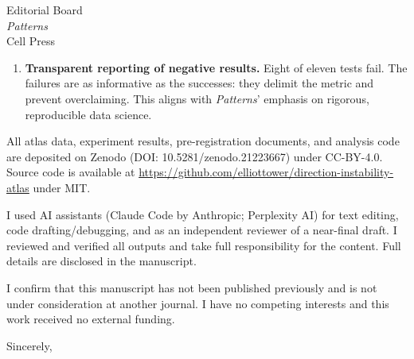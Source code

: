 \documentclass[11pt]{letter}
\begin{document}
\begin{letter}{Editorial Board \\ \emph{Patterns} \\ Cell Press}
\begin{enumerate}
\item \textbf{Transparent reporting of negative results.} Eight of eleven tests fail. The failures are as informative as the successes: they delimit the metric and prevent overclaiming. This aligns with \emph{Patterns}' emphasis on rigorous, reproducible data science.
\end{enumerate}

All atlas data, experiment results, pre-registration documents, and analysis code are deposited on Zenodo (DOI: 10.5281/zenodo.21223667) under CC-BY-4.0. Source code is available at \url{https://github.com/elliottower/direction-instability-atlas} under MIT.

I used AI assistants (Claude Code by Anthropic; Perplexity AI) for text editing, code drafting/debugging, and as an independent reviewer of a near-final draft. I reviewed and verified all outputs and take full responsibility for the content. Full details are disclosed in the manuscript.

I confirm that this manuscript has not been published previously and is not under consideration at another journal. I have no competing interests and this work received no external funding.

\closing{Sincerely,}

\end{letter}
\end{document}
